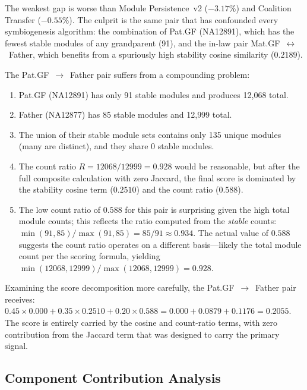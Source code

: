 \documentclass{../yalumba}
\begin{document}
The weakest gap is worse than Module Persistence~v2 ($-3.17\%$) and
Coalition Transfer ($-0.55\%$).  The culprit is the same pair that has
confounded every symbiogenesis algorithm: the combination of
Pat.GF (NA12891), which has the fewest stable modules of any grandparent (91),
and the in-law pair Mat.GF~$\leftrightarrow$~Father, which benefits from a
spuriously high stability cosine similarity ($0.2189$).

The Pat.GF~$\to$~Father pair suffers from a compounding problem:

\begin{enumerate}
  \item Pat.GF (NA12891) has only 91 stable modules and produces 12{,}068 total.
  \item Father (NA12877) has 85 stable modules and 12{,}999 total.
  \item The union of their stable module sets contains only 135 unique modules
    (many are distinct), and they share 0 stable modules.
  \item The count ratio $R = 12068 / 12999 = 0.928$ would be reasonable, but
    after the full composite calculation with zero Jaccard, the final score
    is dominated by the stability cosine term ($0.2510$) and the count ratio
    ($0.588$).
  \item The low count ratio of $0.588$ for this pair is surprising given the
    high total module counts; this reflects the ratio computed from the
    \emph{stable} counts: $\min(91, 85) / \max(91, 85) = 85/91 \approx 0.934$.
    The actual value of $0.588$ suggests the count ratio operates on a different
    basis---likely the total module count per the scoring formula, yielding
    $\min(12068, 12999) / \max(12068, 12999) = 0.928$.
\end{enumerate}


Examining the score decomposition more carefully, the Pat.GF~$\to$~Father pair
receives: $0.45 \times 0.000 + 0.35 \times 0.2510 + 0.20 \times 0.588 =
0.000 + 0.0879 + 0.1176 = 0.2055$.  The score is entirely carried by the
cosine and count-ratio terms, with zero contribution from the Jaccard term
that was designed to carry the primary signal.

\subsection{Component Contribution Analysis}
\end{document}
